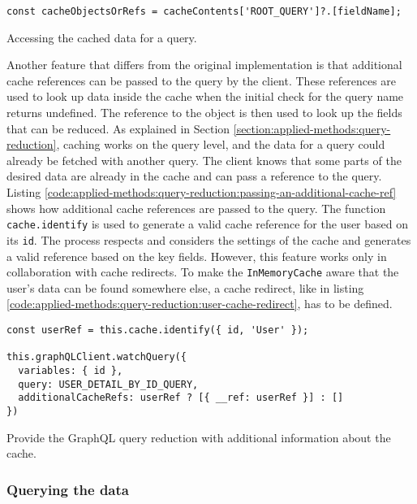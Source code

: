 \ifshowListings
\begin{listing}[H]
\begin{verbatim}
const cacheObjectsOrRefs = cacheContents['ROOT_QUERY']?.[fieldName];
\end{verbatim}
\caption{Accessing the cached data for a query.}\label{code:applied-methods:query-reduction:getting-cache-content}
\end{listing}
\fi

\noindent Another feature that differs from the original implementation is that additional cache references can be passed to the query by the client. These references are used to look up data inside the cache when the initial check for the query name returns undefined. The reference to the object is then used to look up the fields that can be reduced. As explained in Section \ref{section:applied-methods:query-reduction}, caching works on the query level, and the data for a query could already be fetched with another query. The client knows that some parts of the desired data are already in the cache and can pass a reference to the query. Listing \ref{code:applied-methods:query-reduction:passing-an-additional-cache-ref} shows how additional cache references are passed to the query. The function \texttt{cache.identify} is used to generate a valid cache reference for the user based on its \texttt{id}. The process respects and considers the settings of the cache and generates a valid reference based on the key fields. However, this feature works only in collaboration with cache redirects. To make the \texttt{InMemoryCache} aware that the user's data can be found somewhere else, a cache redirect, like in listing \ref{code:applied-methods:query-reduction:user-cache-redirect}, has to be defined.

\ifshowListings
\begin{listing}[H]
\begin{verbatim}
const userRef = this.cache.identify({ id, 'User' });

this.graphQLClient.watchQuery({
  variables: { id },
  query: USER_DETAIL_BY_ID_QUERY,
  additionalCacheRefs: userRef ? [{ __ref: userRef }] : []
})
\end{verbatim}
\caption{Provide the GraphQL query reduction with additional information about the cache.}\label{code:applied-methods:query-reduction:passing-an-additional-cache-ref}
\end{listing}
\fi

\subsubsection{Querying the data}

